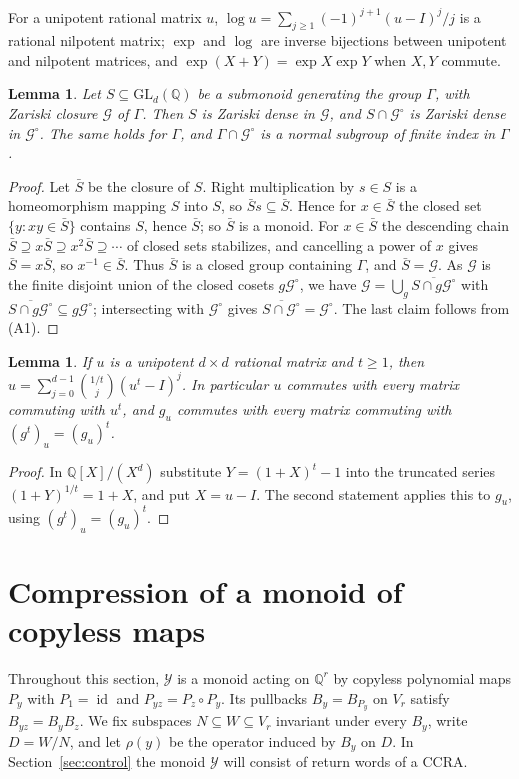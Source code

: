 \documentclass[acmlarge,screen,11pt,nonacm,natbib=false]{acmart}
\newcommand{\Q}{\mathbb{Q}}
\newcommand{\cG}{\mathcal{G}}
\newcommand{\cY}{\mathcal{Y}}
\newcommand{\id}{\operatorname{id}}
\newcommand{\GL}{\mathrm{GL}}
\newtheorem{lemma}[theorem]{Lemma}
\theoremstyle{definition}
\begin{document}
For a unipotent rational matrix $u$, $\log u=\sum_{j\ge1}(-1)^{j+1}(u-I)^j/j$ is a rational nilpotent matrix; $\exp$ and $\log$ are inverse bijections between unipotent and nilpotent matrices, and $\exp(X+Y)=\exp X\exp Y$ when $X,Y$ commute.

\begin{lemma}\label{lem:monoid}
Let $S\subseteq\GL_d(\Q)$ be a submonoid generating the group $\Gamma$, with Zariski closure $\cG$ of $\Gamma$. Then $S$ is Zariski dense in $\cG$, and $S\cap\cG^\circ$ is Zariski dense in $\cG^\circ$. The same holds for $\Gamma$, and $\Gamma\cap\cG^\circ$ is a normal subgroup of finite index in $\Gamma$.
\end{lemma}
\begin{proof}
Let $\bar S$ be the closure of $S$. Right multiplication by $s\in S$ is a homeomorphism mapping $S$ into $S$, so $\bar Ss\subseteq\bar S$. Hence for $x\in\bar S$ the closed set $\{y:xy\in\bar S\}$ contains $S$, hence $\bar S$; so $\bar S$ is a monoid. For $x\in\bar S$ the descending chain $\bar S\supseteq x\bar S\supseteq x^2\bar S\supseteq\cdots$ of closed sets stabilizes, and cancelling a power of $x$ gives $\bar S=x\bar S$, so $x^{-1}\in\bar S$. Thus $\bar S$ is a closed group containing $\Gamma$, and $\bar S=\cG$. As $\cG$ is the finite disjoint union of the closed cosets $g\cG^\circ$, we have $\cG=\bigcup_g\overline{S\cap g\cG^\circ}$ with $\overline{S\cap g\cG^\circ}\subseteq g\cG^\circ$; intersecting with $\cG^\circ$ gives $\overline{S\cap\cG^\circ}=\cG^\circ$. The last claim follows from (A1).
\end{proof}

\begin{lemma}\label{lem:root}
If $u$ is a unipotent $d\times d$ rational matrix and $t\ge1$, then $u=\sum_{j=0}^{d-1}\binom{1/t}{j}(u^t-I)^j$. In particular $u$ commutes with every matrix commuting with $u^t$, and $g_u$ commutes with every matrix commuting with $(g^t)_u=(g_u)^t$.
\end{lemma}
\begin{proof}
In $\Q[X]/(X^d)$ substitute $Y=(1+X)^t-1$ into the truncated series $(1+Y)^{1/t}=1+X$, and put $X=u-I$. The second statement applies this to $g_u$, using $(g^t)_u=(g_u)^t$.
\end{proof}

\section{Compression of a monoid of copyless maps}\label{sec:compression}
Throughout this section, $\cY$ is a monoid acting on $\Q^r$ by copyless polynomial maps $P_y$ with $P_1=\id$ and $P_{yz}=P_z\circ P_y$. Its pullbacks $B_y=B_{P_y}$ on $V_r$ satisfy $B_{yz}=B_yB_z$. We fix subspaces $N\subseteq W\subseteq V_r$ invariant under every $B_y$, write $D=W/N$, and let $\rho(y)$ be the operator induced by $B_y$ on $D$. In Section~\ref{sec:control} the monoid $\cY$ will consist of return words of a CCRA.
\end{document}
